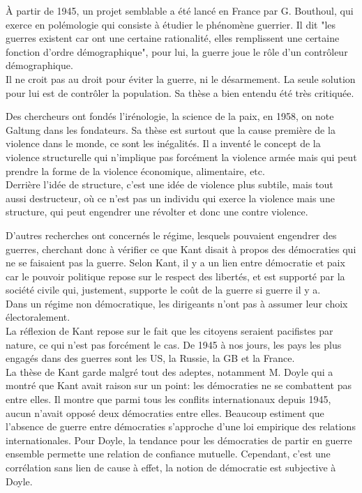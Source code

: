 \documentclass[10pt, a4paper, openany]{book}
\begin{document}
À partir de 1945, un projet semblable a été lancé en France par G. Bouthoul, qui exerce en polémologie qui consiste à étudier le phénomène guerrier. Il dit "les guerres existent car ont une certaine rationalité, elles remplissent une certaine fonction d'ordre démographique", pour lui, la guerre joue le rôle d'un contrôleur démographique. \\
Il ne croit pas au droit pour éviter la guerre, ni le désarmement. La seule solution pour lui est de contrôler la population. Sa thèse a bien entendu été très critiquée. 


Des chercheurs ont fondés l'irénologie, la science de la paix, en 1958, on note Galtung dans les fondateurs. Sa thèse est surtout que la cause première de la violence dans le monde, ce sont les inégalités. Il a inventé le concept de la violence structurelle qui n'implique pas forcément la violence armée mais qui peut prendre la forme de la violence économique, alimentaire, etc. \\
Derrière l'idée de structure, c'est une idée de violence plus subtile, mais tout aussi destructeur, où ce n'est pas un individu qui exerce la violence mais une structure, qui peut engendrer une révolter et donc une contre violence. 


D'autres recherches ont concernés le régime, lesquels pouvaient engendrer des guerres, cherchant donc à vérifier ce que Kant disait à propos des démocraties qui ne se faisaient pas la guerre. Selon Kant, il y a un lien entre démocratie et paix car le pouvoir politique repose sur le respect des libertés, et est supporté par la société civile qui, justement, supporte le coût de la guerre si guerre il y a. \\
Dans un régime non démocratique, les dirigeants n'ont pas à assumer leur choix électoralement. \\
La réflexion de Kant repose sur le fait que les citoyens seraient pacifistes par nature, ce qui n'est pas forcément le cas. De 1945 à nos jours, les pays les plus engagés dans des guerres sont les US, la Russie, la GB et la France. \\
La thèse de Kant garde malgré tout des adeptes, notamment M. Doyle qui a montré que Kant avait raison sur un point: les démocraties ne se combattent pas entre elles. Il montre que parmi tous les conflits internationaux depuis 1945, aucun n'avait opposé deux démocraties entre elles. Beaucoup estiment que l'absence de guerre entre démocraties s'approche d'une loi empirique des relations internationales. Pour Doyle, la tendance pour les démocraties de partir en guerre ensemble permette une relation de confiance mutuelle. Cependant, c'est une corrélation sans lien de cause à effet, la notion de démocratie est subjective à Doyle.
\end{document}
